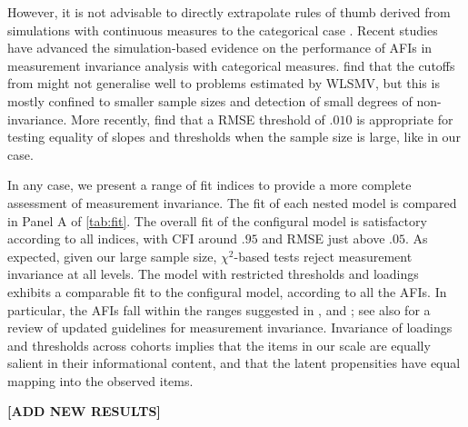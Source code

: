 However, it is not advisable to directly extrapolate rules of thumb derived from simulations with continuous measures to the categorical case \citep{Lubke2004}. Recent studies have advanced the simulation-based evidence on the performance of AFIs in measurement invariance analysis with categorical measures. \citet{Sass2014} find that the cutoffs from \citet{Chen2007} might not generalise well to problems estimated by WLSMV, but this is mostly confined to smaller sample sizes and detection of small degrees of non-invariance. More recently, \citet{Rutkowski2017} find that a \textDelta RMSE threshold of $.010$ is appropriate for testing equality of slopes and thresholds when the sample size is large, like in our case. 

In any case, we present a range of fit indices to provide a more complete assessment of measurement invariance. The fit of each nested model is compared in Panel A of \autoref{tab:fit}. The overall fit of the configural model is satisfactory according to all indices, with CFI around $.95$ and RMSE just above $.05$. As expected, given our large sample size, $\chi^2$-based tests reject measurement invariance at all levels. The model with restricted thresholds and loadings exhibits a comparable fit to the configural model, according to all the AFIs. In particular, the \textDelta AFIs fall within the ranges suggested in \citet{Chen2007}, \citet{Rutkowski2017} and \citet{Svetina2017}; see also \citet{Svetina2019} for a review of updated guidelines for measurement invariance. Invariance of loadings and thresholds across cohorts implies that the items in our scale are equally salient in their informational content, and that the latent propensities have equal mapping into the observed items. 

\textbf{[ADD NEW RESULTS]}

